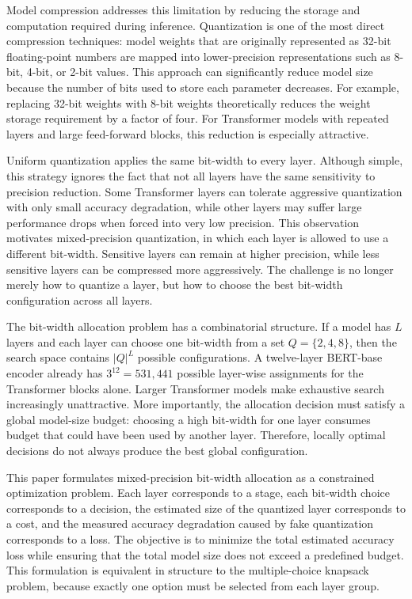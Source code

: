 \documentclass[conference]{IEEEtran}
\begin{document}
Model compression addresses this limitation by reducing the storage and computation required during inference. Quantization is one of the most direct compression techniques: model weights that are originally represented as 32-bit floating-point numbers are mapped into lower-precision representations such as 8-bit, 4-bit, or 2-bit values. This approach can significantly reduce model size because the number of bits used to store each parameter decreases. For example, replacing 32-bit weights with 8-bit weights theoretically reduces the weight storage requirement by a factor of four. For Transformer models with repeated layers and large feed-forward blocks, this reduction is especially attractive.

Uniform quantization applies the same bit-width to every layer. Although simple, this strategy ignores the fact that not all layers have the same sensitivity to precision reduction. Some Transformer layers can tolerate aggressive quantization with only small accuracy degradation, while other layers may suffer large performance drops when forced into very low precision. This observation motivates mixed-precision quantization, in which each layer is allowed to use a different bit-width. Sensitive layers can remain at higher precision, while less sensitive layers can be compressed more aggressively. The challenge is no longer merely how to quantize a layer, but how to choose the best bit-width configuration across all layers.

The bit-width allocation problem has a combinatorial structure. If a model has $L$ layers and each layer can choose one bit-width from a set $Q = \{2,4,8\}$, then the search space contains $|Q|^L$ possible configurations. A twelve-layer BERT-base encoder already has $3^{12} = 531{,}441$ possible layer-wise assignments for the Transformer blocks alone. Larger Transformer models make exhaustive search increasingly unattractive. More importantly, the allocation decision must satisfy a global model-size budget: choosing a high bit-width for one layer consumes budget that could have been used by another layer. Therefore, locally optimal decisions do not always produce the best global configuration.

This paper formulates mixed-precision bit-width allocation as a constrained optimization problem. Each layer corresponds to a stage, each bit-width choice corresponds to a decision, the estimated size of the quantized layer corresponds to a cost, and the measured accuracy degradation caused by fake quantization corresponds to a loss. The objective is to minimize the total estimated accuracy loss while ensuring that the total model size does not exceed a predefined budget. This formulation is equivalent in structure to the multiple-choice knapsack problem, because exactly one option must be selected from each layer group.
\end{document}
